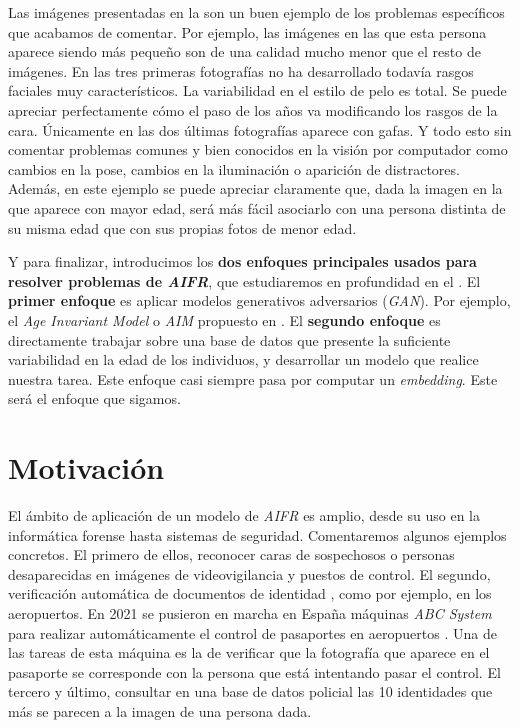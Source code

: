 Las imágenes presentadas en la  son un buen ejemplo de los problemas específicos que acabamos de comentar. Por ejemplo, las imágenes en las que esta persona aparece siendo más pequeño son de una calidad mucho menor que el resto de imágenes. En las tres primeras fotografías no ha desarrollado todavía rasgos faciales muy característicos. La variabilidad en el estilo de pelo es total. Se puede apreciar perfectamente cómo el paso de los años va modificando los rasgos de la cara. Únicamente en las dos últimas fotografías aparece con gafas. Y todo esto sin comentar problemas comunes y bien conocidos en la visión por computador como cambios en la pose, cambios en la iluminación o aparición de distractores. Además, en este ejemplo se puede apreciar claramente que, dada la imagen en la que aparece con mayor edad, será más fácil asociarlo con una persona distinta de su misma edad que con sus propias fotos de menor edad.

Y para finalizar, introducimos los \textbf{dos enfoques principales usados para resolver problemas de \textit{AIFR}}, que estudiaremos en profundidad en el . El \textbf{primer enfoque} es aplicar modelos generativos adversarios (\textit{GAN}). Por ejemplo, el \textit{Age Invariant Model} o \textit{AIM} propuesto en \cite{informatica:tecnica_sintesis_aifr}. El \textbf{segundo enfoque} es directamente trabajar sobre una base de datos que presente la suficiente variabilidad en la edad de los individuos, y desarrollar un modelo que realice nuestra tarea. Este enfoque casi siempre pasa por computar un \textit{embedding}. Este será el enfoque que sigamos.

\section{Motivación}

El ámbito de aplicación de un modelo de \textit{AIFR} es amplio, desde su uso en la informática forense \cite{informatica:libro_informatica_forense} hasta sistemas de seguridad. Comentaremos algunos ejemplos concretos. El primero de ellos, reconocer caras de sospechosos o personas desaparecidas en imágenes de videovigilancia y puestos de control. El segundo, verificación automática de documentos de identidad  \cite{informatica:tecnica_sintesis_aifr}, como por ejemplo, en los aeropuertos. En 2021 se pusieron en marcha en España máquinas \textit{ABC System} para realizar automáticamente el control de pasaportes en aeropuertos \cite{informatica:articulo_abc_system}. Una de las tareas de esta máquina es la de verificar que la fotografía que aparece en el pasaporte se corresponde con la persona que está intentando pasar el control. El tercero y último, consultar en una base de datos policial las 10 identidades que más se parecen a la imagen de una persona dada.

